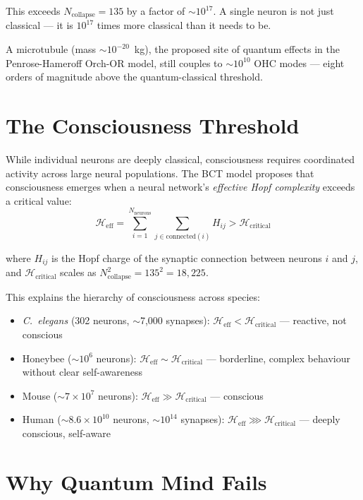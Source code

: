 \documentclass[aps,prl,twocolumn,superscriptaddress]{revtex4-2}
\begin{document}
This exceeds $N_{\mathrm{collapse}} = 135$ by a factor of $\sim 10^{17}$. A single neuron is not just classical --- it is $10^{17}$ times more classical than it needs to be.

A microtubule (mass $\sim 10^{-20}$~kg), the proposed site of quantum effects in the Penrose-Hameroff Orch-OR model, still couples to $\sim 10^{10}$ OHC modes --- eight orders of magnitude above the quantum-classical threshold.

\section{The Consciousness Threshold}

While individual neurons are deeply classical, consciousness requires coordinated activity across large neural populations. The BCT model proposes that consciousness emerges when a neural network's \emph{effective Hopf complexity} exceeds a critical value:
\begin{equation}
\mathcal{H}_{\mathrm{eff}} = \sum_{i=1}^{N_{\mathrm{neurons}}} \sum_{j \in \mathrm{connected}(i)} H_{ij} > \mathcal{H}_{\mathrm{critical}}
\end{equation}

where $H_{ij}$ is the Hopf charge of the synaptic connection between neurons $i$ and $j$, and $\mathcal{H}_{\mathrm{critical}}$ scales as $N_{\mathrm{collapse}}^2 = 135^2 = 18{,}225$.

This explains the hierarchy of consciousness across species:
\begin{itemize}
\item \textit{C.\ elegans} (302 neurons, $\sim$7,000 synapses): $\mathcal{H}_{\mathrm{eff}} < \mathcal{H}_{\mathrm{critical}}$ --- reactive, not conscious
\item Honeybee ($\sim 10^6$ neurons): $\mathcal{H}_{\mathrm{eff}} \sim \mathcal{H}_{\mathrm{critical}}$ --- borderline, complex behaviour without clear self-awareness
\item Mouse ($\sim 7 \times 10^7$ neurons): $\mathcal{H}_{\mathrm{eff}} \gg \mathcal{H}_{\mathrm{critical}}$ --- conscious
\item Human ($\sim 8.6 \times 10^{10}$ neurons, $\sim 10^{14}$ synapses): $\mathcal{H}_{\mathrm{eff}} \ggg \mathcal{H}_{\mathrm{critical}}$ --- deeply conscious, self-aware
\end{itemize}

\section{Why Quantum Mind Fails}
\end{document}
